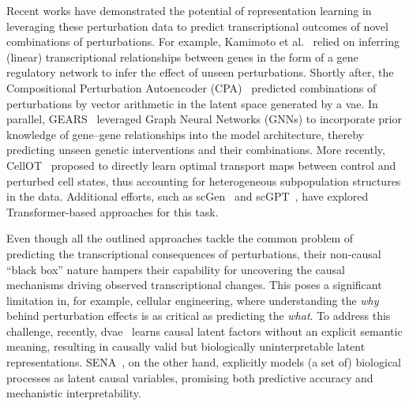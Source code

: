 \documentclass[10pt,letterpaper]{article}
\theoremstyle{definition}
\theoremstyle{remark}
\begin{document}
Recent works have demonstrated the potential of representation learning in leveraging these perturbation data to predict transcriptional outcomes of novel combinations of perturbations. For example, Kamimoto et al.~\cite{kamimoto2023dissecting} relied on inferring (linear) transcriptional relationships between genes in the form of a gene regulatory network to infer the effect of unseen perturbations.
Shortly after, the Compositional Perturbation Autoencoder (CPA)~\cite{lotfollahi2023predicting} predicted combinations of perturbations by vector arithmetic in the latent space generated by a \gls{vae}.
In parallel, GEARS~\cite{roohani2024predicting} leveraged Graph Neural Networks (GNNs) to incorporate prior knowledge of gene--gene relationships into the model architecture, thereby predicting unseen genetic interventions and their combinations. More recently, CellOT~\cite{bunne2023learning} proposed to directly learn optimal transport maps between control and perturbed cell states, thus accounting for heterogeneous subpopulation structures in the data.
Additional efforts, such as scGen~\cite{lotfollahi2019scgen} and scGPT~\cite{cui2024scgpt}, have explored Transformer-based approaches for this task.

Even though all the outlined approaches tackle the common problem of predicting the transcriptional consequences of perturbations, their non-causal ``black box'' nature hampers their capability for uncovering the causal mechanisms driving observed transcriptional changes.
This poses a significant limitation in, for example, cellular engineering, where understanding the \emph{why} behind perturbation effects is as critical as predicting the \emph{what}.
To address this challenge, recently, \gls{dvae}~\cite{zhang2023identifiability} learns causal latent factors without an explicit semantic meaning, resulting in causally valid but biologically uninterpretable latent representations.
SENA~\cite{de2025interpretable}, on the other hand, explicitly models (a set of) biological processes as latent causal variables, promising both predictive accuracy and mechanistic interpretability.
\end{document}
